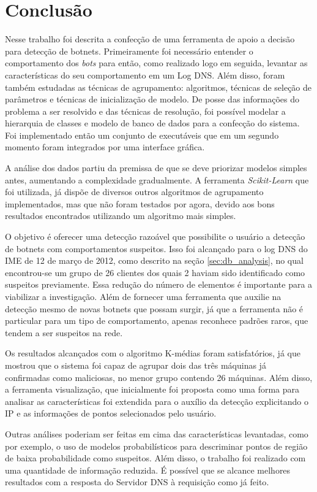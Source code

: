 \chapter{Conclusão}

Nesse trabalho foi descrita a confecção de uma ferramenta de apoio a decisão para detecção de botnets. Primeiramente foi necessário entender o comportamento dos \textit{bots} para então, como realizado logo em seguida, levantar as características do seu comportamento em um Log DNS. Além disso, foram também estudadas as técnicas de agrupamento: algoritmos, técnicas de seleção de parâmetros e técnicas de inicialização de modelo. De posse das informações do problema a ser resolvido e das técnicas de resolução, foi possível modelar a hierarquia de classes e modelo de banco de dados para a confecção do sistema. Foi implementado então um conjunto de executáveis que em um segundo momento foram integrados por uma interface gráfica.

A análise dos dados partiu da premissa de que se deve priorizar modelos simples antes, aumentando a complexidade gradualmente. A ferramenta \textit{Scikit-Learn} que foi utilizada, já dispõe de diversos outros algoritmos de agrupamento implementados, mas que não foram testados por agora, devido aos bons resultados encontrados utilizando um algoritmo mais simples.

O objetivo é oferecer uma detecção razoável que possibilite o usuário a detecção de botnets com comportamentos suspeitos. Isso foi alcançado para o log DNS do IME de 12 de março de 2012, como descrito na seção \ref{sec:db_analysis}, no qual encontrou-se um grupo de 26 clientes dos quais 2 haviam sido identificado como suspeitos previamente. Essa redução do número de elementos é importante para a viabilizar a investigação. Além de fornecer uma ferramenta que auxilie na detecção mesmo de novas botnets que possam surgir, já que a ferramenta não é particular para um tipo de comportamento, apenas reconhece padrões raros, que tendem a ser suspeitos na rede.

Os resultados alcançados com o algoritmo K-médias foram satisfatórios, já que mostrou que o sistema foi capaz de agrupar dois das três máquinas já confirmadas como maliciosas, no menor grupo contendo 26 máquinas. Além disso, a ferramenta visualização, que inicialmente foi proposta como uma forma para analisar as características foi extendida para o auxílio da detecção explicitando o IP e as informações de pontos selecionados pelo usuário.

Outras análises poderiam ser feitas em cima das características levantadas, como por exemplo, o uso de modelos probabilísticos para descriminar pontos de região de baixa probabilidade como suspeitos. Além disso, o trabalho foi realizado com uma quantidade de informação reduzida. É possível que se alcance melhores resultados com a resposta do Servidor DNS à requisição como já feito\citep{schonewille2006domain}.